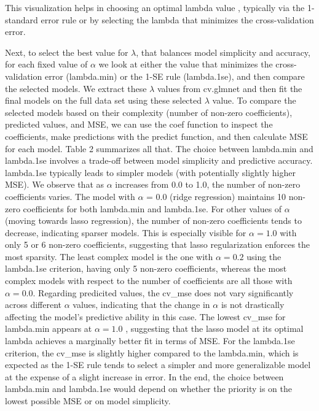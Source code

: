 \documentclass[
]{article}
\begin{document}
This visualization helps in choosing an optimal lambda value , typically
via the 1-standard error rule or by selecting the lambda that minimizes
the cross-validation error.

Next, to select the best value for \(\lambda\), that balances model
simplicity and accuracy, for each fixed value of \(\alpha\) we look at
either the value that minimizes the cross-validation error (lambda.min)
or the 1-SE rule (lambda.1se), and then compare the selected models. We
extract these \(\lambda\) values from cv.glmnet and then fit the final
models on the full data set using these selected \(\lambda\) value. To
compare the selected models based on their complexity (number of
non-zero coefficients), predicted values, and MSE, we can use the coef
function to inspect the coefficients, make predictions with the predict
function, and then calculate MSE for each model. Table 2 summarizes all
that. The choice between lambda.min and lambda.1se involves a trade-off
between model simplicity and predictive accuracy. lambda.1se typically
leads to simpler models (with potentially slightly higher MSE). We
observe that as \(\alpha\) increases from 0.0 to 1.0, the number of
non-zero coefficients varies. The model with \(\alpha\) = 0.0 (ridge
regression) maintains 10 non-zero coefficients for both lambda.min and
lambda.1se. For other values of \(\alpha\) (moving towards lasso
regression), the number of non-zero coefficients tends to decrease,
indicating sparser models. This is especially visible for
\(\alpha = 1.0\) with only 5 or 6 non-zero coefficients, suggesting that
lasso regularization enforces the most sparsity. The least complex model
is the one with \(\alpha = 0.2\) using the lambda.1se criterion, having
only 5 non-zero coefficients, whereas the most complex models with
respect to the number of coefficients are all those with
\(\alpha = 0.0\). Regarding predicited values, the cv\_mse does not vary
significantly across different \(\alpha\) values, indicating that the
change in \(\alpha\) is not drastically affecting the model's predictive
ability in this case. The lowest cv\_mse for lambda.min appears at
\(\alpha = 1.0\) , suggesting that the lasso model at its optimal lambda
achieves a marginally better fit in terms of MSE. For the lambda.1se
criterion, the cv\_mse is slightly higher compared to the lambda.min,
which is expected as the 1-SE rule tends to select a simpler and more
generalizable model at the expense of a slight increase in error. In the
end, the choice between lambda.min and lambda.1se would depend on
whether the priority is on the lowest possible MSE or on model
simplicity.
\end{document}
